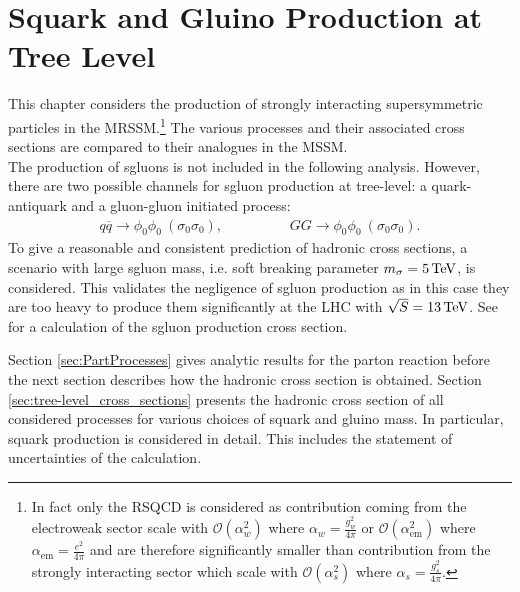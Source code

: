 \section{Squark and Gluino Production at Tree Level}\label{sec:SquarkGluinoTree}
This chapter considers the production of strongly interacting supersymmetric particles in the MRSSM.\footnote{In fact only the RSQCD is considered as contribution coming from the electroweak sector scale with $\mathcal{O}(\alpha_w^2)$ where $\alpha_w = \frac{g_w^2}{4\pi}$ or $\mathcal{O}(\alpha_{\mathrm{em}}^2)$ where $\alpha_{\mathrm{em}} = \frac{e^2}{4\pi}$ and are therefore significantly smaller than contribution from the strongly interacting sector which scale with $\mathcal{O}(\alpha_s^2)$ where $\alpha_s = \frac{g_s^2}{4\pi}$.} The various processes and their associated cross sections are compared to their analogues in the MSSM.\\
The production of sgluons is not included in the following analysis. However, there are two possible channels for sgluon production at tree-level: a quark-antiquark and a gluon-gluon initiated process:
\begin{align}
q\overline{q} \to \phi_0\phi_0\ (\sigma_0\sigma_0), \hspace{2cm} GG \to \phi_0\phi_0\ (\sigma_0\sigma_0).
\end{align}
To give a reasonable and consistent prediction of hadronic cross sections, a scenario with large sgluon mass, i.e. soft breaking parameter $m_\sigma = \unit[5]{TeV}$, is considered. This validates the negligence of sgluon production as in this case they are too heavy to produce them significantly at the LHC with $\sqrt{S} = \unit[13]{TeV}$. See \cite{Choi:2008ub, GoncalvesNetto:2012nt, phdWojciech} for a calculation of the sgluon production cross section. Section \ref{sec:PartProcesses} gives analytic results for the parton reaction before the next section describes how the hadronic cross section is obtained. Section \ref{sec:tree-level_cross_sections} presents the hadronic cross section of all considered processes for various choices of squark and gluino mass. In particular, squark production is considered in detail. This includes the statement of uncertainties of the calculation.




